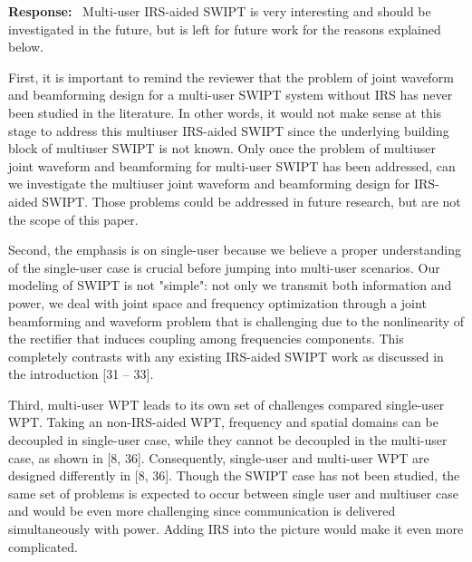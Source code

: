 \documentclass{article}
\newcounter{reviewer}
\newcounter{response}[reviewer]
\newenvironment{response}
	{\refstepcounter{response} \medskip \noindent \textbf{Response:}\ }
	{\medskip}
\begin{document}
\begin{reviewersection}
		\begin{response}
			Multi-user IRS-aided SWIPT is very interesting and should be investigated in the future, but is left for future work for the reasons explained below.

			First, it is important to remind the reviewer that the problem of joint waveform and beamforming design for a multi-user SWIPT system without IRS has never been studied in the literature. In other words, it would not make sense at this stage to address this multiuser IRS-aided SWIPT since the underlying building block of multiuser SWIPT is not known. Only once the problem of multiuser joint waveform and beamforming for multi-user SWIPT has been addressed, can we investigate the multiuser joint waveform and beamforming design for IRS-aided SWIPT. Those problems could be addressed in future research, but are not the scope of this paper.

			Second, the emphasis is on single-user because we believe a proper understanding of the single-user case is crucial before jumping into multi-user scenarios. Our modeling of SWIPT is not "simple": not only we transmit both information and power, we deal with joint space and frequency optimization through a joint beamforming and waveform problem that is challenging due to the nonlinearity of the rectifier that induces coupling among frequencies components. This completely contrasts with any existing IRS-aided SWIPT work as discussed in the introduction [31 -- 33].

			Third, multi-user WPT leads to its own set of challenges compared single-user WPT. Taking an non-IRS-aided WPT, frequency and spatial domains can be decoupled in single-user case, while they cannot be decoupled in the multi-user case, as shown in [8, 36]. Consequently, single-user and multi-user WPT are designed differently in [8, 36]. Though the SWIPT case has not been studied, the same set of problems is expected to occur between single user and multiuser case and would be even more challenging since communication is delivered simultaneously with power. Adding IRS into the picture would make it even more complicated.
			\label{re:1.2}
		\end{response}


\end{reviewersection}
\end{document}
